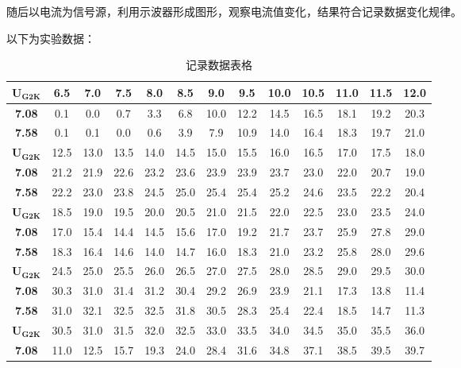 \documentclass{ctexart}
\begin{document}
随后以电流为信号源，利用示波器形成图形，观察电流值变化，结果符合记录数据变化规律。

以下为实验数据：

\begin{table}[h]
    \centering
    \caption{记录数据表格}
    \label{tab:data1}
    \begin{tabular}{ c | c c c c c c c c c c c c}
      \toprule
      $\mathbf{U_{G2K}}$  & 6.5  & 7.0  & 7.5  & 8.0  & 8.5  & 9.0  & 9.5  & 10.0  & 10.5  & 11.0  & 11.5  & 12.0\\
      \hline
      \textbf{7.08} & 0.1  & 0.0  & 0.7  & 3.3  & 6.8  & 10.0  & 12.2  & 14.5  & 16.5  & 18.1  & 19.2  & 20.3 \\
      \textbf{7.58} & 0.1  & 0.1  & 0.0  & 0.6  & 3.9  & 7.9  & 10.9  & 14.0  & 16.4  & 18.3  & 19.7  & 21.0 \\
      \hline
      $\mathbf{U_{G2K}}$  & 12.5  & 13.0  & 13.5  & 14.0  & 14.5  & 15.0  & 15.5  & 16.0  & 16.5  & 17.0  & 17.5  & 18.0\\
      \hline
      \textbf{7.08} & 21.2  & 21.9  & 22.6  & 23.2  & 23.6  & 23.9  & 23.9  & 23.7  & 23.0  & 22.0  & 20.7  & 19.0 \\
      \textbf{7.58} & 22.2  & 23.0  & 23.8  & 24.5  & 25.0  & 25.4  & 25.4  & 25.2  & 24.6  & 23.5  & 22.2  & 20.4 \\
      \hline
      $\mathbf{U_{G2K}}$  & 18.5  & 19.0  & 19.5  & 20.0  & 20.5  & 21.0  & 21.5  & 22.0  & 22.5  & 23.0  & 23.5  & 24.0\\
      \hline
      \textbf{7.08} & 17.0  & 15.4  & 14.4  & 14.5  & 15.6  & 17.0  & 19.2  & 21.7  & 23.7  & 25.9  & 27.8  & 29.0 \\
      \textbf{7.58} & 18.3  & 16.4  & 14.6  & 14.0  & 14.7  & 16.0  & 18.3  & 21.0  & 23.2  & 25.8  & 28.0  & 29.6 \\
      \hline
      $\mathbf{U_{G2K}}$  & 24.5  & 25.0  & 25.5  & 26.0  & 26.5  & 27.0  & 27.5  & 28.0  & 28.5  & 29.0  & 29.5  & 30.0\\
      \hline
      \textbf{7.08} & 30.3  & 31.0  & 31.4  & 31.2  & 30.4  & 29.2  & 26.9  & 23.9  & 21.1  & 17.3  & 13.8  & 11.4 \\
      \textbf{7.58} & 31.0  & 32.1  & 32.5  & 32.5  & 31.8  & 30.5  & 28.3  & 25.4  & 22.4  & 18.5  & 14.7  & 11.3 \\
      \hline
      $\mathbf{U_{G2K}}$  & 30.5  & 31.0  & 31.5  & 32.0  & 32.5  & 33.0  & 33.5  & 34.0  & 34.5  & 35.0  & 35.5  & 36.0\\
      \hline
      \textbf{7.08} & 11.0  & 12.5  & 15.7  & 19.3  & 24.0  & 28.4  & 31.6  & 34.8  & 37.1  & 38.5  & 39.5  & 39.7 \\

\end{tabular}
\end{table}
\end{document}
